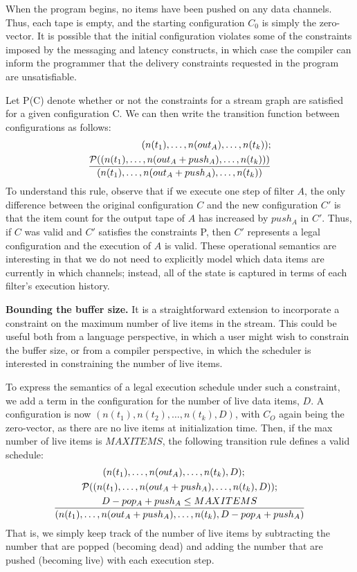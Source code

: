 When the program begins, no items have been pushed on any data
channels.  Thus, each tape is empty, and the starting configuration
$C_0$ is simply the zero-vector.  It is possible that the initial
configuration violates some of the constraints imposed by the
messaging and latency constructs, in which case the compiler can
inform the programmer that the delivery constraints requested in the
program are unsatisfiable.

Let {\cal P}(C) denote whether or not the constraints for a stream
graph are satisfied for a given configuration C.  We can then write
the transition function between configurations as follows:
\begin{align*}
(n(t_1), \dots , n(out_A), \dots, n(t_k)); \\ \frac{{\cal P}((n(t_1), \dots , n(out_A + push_A), \dots, n(t_k)))}{(n(t_1), \dots , n(out_A + push_A), \dots, n(t_k))}
\end{align*}
To understand this rule, observe that if we execute one step of filter
$A$, the only difference between the original configuration $C$ and
the new configuration $C'$ is that the item count for the output tape
of $A$ has increased by $push_A$ in $C'$.  Thus, if $C$ was valid and
$C'$ satisfies the constraints {\cal P}, then $C'$ represents a legal
configuration and the execution of $A$ is valid.  These operational
semantics are interesting in that we do not need to explicitly model
which data items are currently in which channels; instead, all of the
state is captured in terms of each filter's execution history.

{\bf Bounding the buffer size.}  It is a straightforward extension to
incorporate a constraint on the maximum number of live items in the
stream.  This could be useful both from a language perspective, in
which a user might wish to constrain the buffer size, or from a
compiler perspective, in which the scheduler is interested in
constraining the number of live items.

To express the semantics of a legal execution schedule under such a
constraint, we add a term in the configuration for the number of live
data items, $D$.  A configuration is now $(n(t_1), n(t_2), \dots,
n(t_k), D)$, with $C_O$ again being the zero-vector, as there are no
live items at initialization time.  Then, if the max number of live
items is $MAXITEMS$, the following transition rule defines a valid
schedule:
\begin{align*}
& \hspace{0.7in} (n(t_1), \dots , n(out_A), \dots, n(t_k), D); \\ &
\hspace{0.4in} {\cal P}((n(t_1), \dots , n(out_A + push_A), \dots,
n(t_k), D)); \\ & \frac{D - pop_A + push_A \le MAXITEMS}{(n(t_1),
\dots , n(out_A + push_A),
\dots, n(t_k), D - pop_A + push_A)}
\end{align*}
That is, we simply keep track of the number of live items by
subtracting the number that are popped (becoming dead) and adding the
number that are pushed (becoming live) with each execution step.

